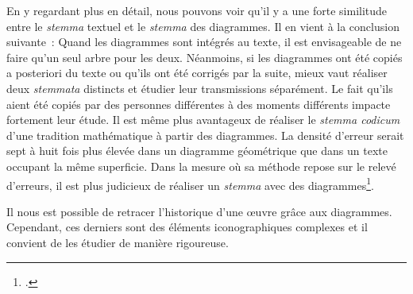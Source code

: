 En y regardant plus en détail, nous pouvons voir qu'il y a une forte similitude entre le \textit{stemma} textuel et le \textit{stemma} des diagrammes.
Il en vient à la conclusion suivante~: Quand les diagrammes sont intégrés au texte, il est envisageable de ne faire qu'un seul arbre pour les deux.
Néanmoins, si les diagrammes ont été copiés a posteriori du texte ou qu'ils ont été corrigés par la suite, mieux vaut réaliser deux \textit{stemmata} distincts et étudier leur transmissions séparément.
Le fait qu'ils aient été copiés par des personnes différentes à des moments différents impacte fortement leur étude.
Il est même plus avantageux de réaliser le \textit{stemma codicum} d'une tradition mathématique à partir des diagrammes.
La densité d'erreur serait sept à huit fois plus élevée dans un diagramme géométrique que dans un texte occupant la même superficie.
Dans la mesure où sa méthode repose sur le relevé d'erreurs, il est plus judicieux de réaliser un \textit{stemma} avec des diagrammes\footcite{raynaudBuildingStemmaCodicum2014}.

Il nous est possible de retracer l'historique d'une œuvre grâce aux diagrammes.
Cependant, ces derniers sont des éléments iconographiques complexes et il convient de les étudier de manière rigoureuse.